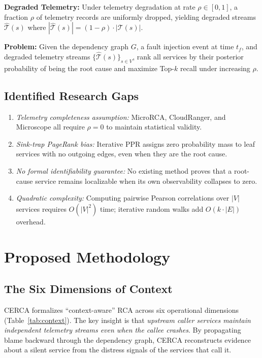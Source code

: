 \documentclass[conference]{IEEEtran}
\begin{document}
\textbf{Degraded Telemetry:} Under telemetry degradation at rate $\rho \in [0, 1]$, a fraction $\rho$ of telemetry records are uniformly dropped, yielding degraded streams $\hat{\mathcal{T}}(s)$ where $|\hat{\mathcal{T}}(s)| = (1 - \rho) \cdot |\mathcal{T}(s)|$.

\textbf{Problem:} Given the dependency graph $G$, a fault injection event at time $t_f$, and degraded telemetry streams $\{\hat{\mathcal{T}}(s)\}_{s \in V}$, rank all services by their posterior probability of being the root cause and maximize Top-$k$ recall under increasing $\rho$.

\subsection{Identified Research Gaps}

\begin{enumerate}
    \item \textit{Telemetry completeness assumption:} MicroRCA, CloudRanger, and Microscope all require $\rho = 0$ to maintain statistical validity.
    \item \textit{Sink-trap PageRank bias:} Iterative PPR assigns zero probability mass to leaf services with no outgoing edges, even when they are the root cause.
    \item \textit{No formal identifiability guarantee:} No existing method proves that a root-cause service remains localizable when its own observability collapses to zero.
    \item \textit{Quadratic complexity:} Computing pairwise Pearson correlations over $|V|$ services requires $O(|V|^2)$ time; iterative random walks add $O(k \cdot |E|)$ overhead.
\end{enumerate}

\section{Proposed Methodology}

\subsection{The Six Dimensions of Context}

CERCA formalizes ``context-aware'' RCA across six operational dimensions (Table~\ref{tab:context}). The key insight is that \textit{upstream caller services maintain independent telemetry streams even when the callee crashes}. By propagating blame backward through the dependency graph, CERCA reconstructs evidence about a silent service from the distress signals of the services that call it.
\end{document}
